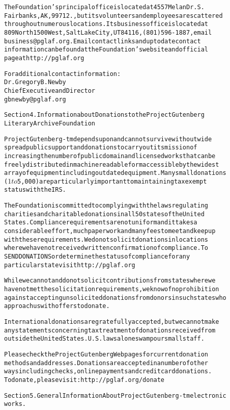 \documentclass[12pt,leqno]{book}[2005/09/16]
\newenvironment{PGtext}{%
\begin{alltt}
\fontsize{9.2}{10.5}\ttfamily\selectfont}%
{\end{alltt}}
\begin{document}
\begin{PGtext}
The Foundation's principal office is located at 4557 Melan Dr. S.
Fairbanks, AK, 99712., but its volunteers and employees are scattered
throughout numerous locations.  Its business office is located at
809 North 1500 West, Salt Lake City, UT 84116, (801) 596-1887, email
business@pglaf.org.  Email contact links and up to date contact
information can be found at the Foundation's web site and official
page at http://pglaf.org

For additional contact information:
     Dr. Gregory B. Newby
     Chief Executive and Director
     gbnewby@pglaf.org


Section 4.  Information about Donations to the Project Gutenberg
Literary Archive Foundation

Project Gutenberg-tm depends upon and cannot survive without wide
spread public support and donations to carry out its mission of
increasing the number of public domain and licensed works that can be
freely distributed in machine readable form accessible by the widest
array of equipment including outdated equipment.  Many small donations
($1 to $5,000) are particularly important to maintaining tax exempt
status with the IRS.

The Foundation is committed to complying with the laws regulating
charities and charitable donations in all 50 states of the United
States.  Compliance requirements are not uniform and it takes a
considerable effort, much paperwork and many fees to meet and keep up
with these requirements.  We do not solicit donations in locations
where we have not received written confirmation of compliance.  To
SEND DONATIONS or determine the status of compliance for any
particular state visit http://pglaf.org

While we cannot and do not solicit contributions from states where we
have not met the solicitation requirements, we know of no prohibition
against accepting unsolicited donations from donors in such states who
approach us with offers to donate.

International donations are gratefully accepted, but we cannot make
any statements concerning tax treatment of donations received from
outside the United States.  U.S. laws alone swamp our small staff.

Please check the Project Gutenberg Web pages for current donation
methods and addresses.  Donations are accepted in a number of other
ways including checks, online payments and credit card donations.
To donate, please visit: http://pglaf.org/donate


Section 5.  General Information About Project Gutenberg-tm electronic
works.


\end{PGtext}
\end{document}
